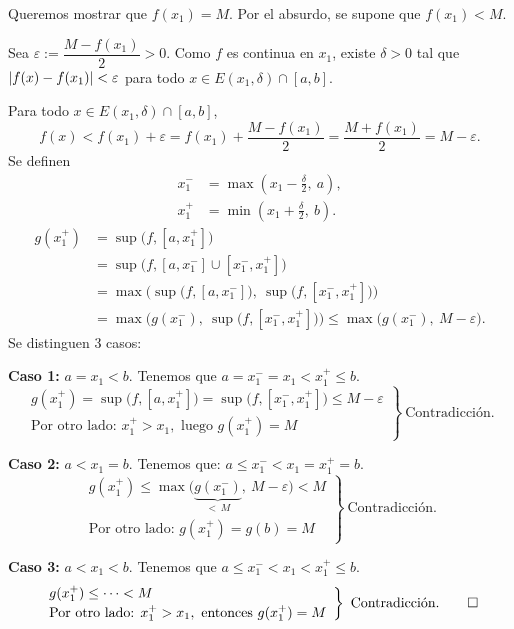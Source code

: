 \documentclass[11pt,a4paper]{article}
\begin{document}
\begin{demo}
Queremos mostrar que $f(x_1)=M$. Por el absurdo, se supone que $f(x_1)<M$.

Sea $\varepsilon:=\dfrac{M-f(x_1)}{2}>0$. Como $f$ es continua en $x_1$, existe $\delta>0$ tal que $\lvert f(x)-f(x_1)\rvert<\varepsilon$ para todo $x\in E(x_1,\delta)\cap[a,b]$.

Para todo $x\in E(x_1,\delta)\cap[a,b]$,
\[
  f(x)<f(x_1)+\varepsilon = f(x_1)+\frac{M-f(x_1)}{2} = \frac{M+f(x_1)}{2} = M-\varepsilon.
\]
Se definen
\begin{align*}
  x_1^- &= \max\left(x_1-\frac\delta2,\ a\right),\\
  x_1^+ &= \min\left(x_1+\frac\delta2,\ b\right).
\end{align*}
\begin{align*}
  g(x_1^+) &= \sup\big(f,[a,x_1^+]\big)\\
  &= \sup\big(f,[a,x_1^-]\cup[x_1^-,x_1^+]\big)\\
  &= \max\Big(\sup\big(f,[a,x_1^-]\big),\ \sup\big(f,[x_1^-,x_1^+]\big)\Big)\\
  &= \max\Big(g(x_1^-),\ \sup\big(f,[x_1^-,x_1^+]\big)\Big) \leq \max\big(g(x_1^-),\ M-\varepsilon\big).
\end{align*}
Se distinguen 3 casos:

\textbf{Caso 1:} $a=x_1<b$. Tenemos que $a=x_1^-=x_1<x_1^+\leq b$.
\[
  \left.\begin{array}{l}
    g(x_1^+)=\sup\big(f,[a,x_1^+]\big)=\sup\big(f,[x_1^-,x_1^+]\big)\leq M-\varepsilon\\[2pt]
    \text{Por otro lado: } x_1^+>x_1, \text{ luego } g(x_1^+)=M
  \end{array}\right\}\ \text{Contradicción.}
\]

\textbf{Caso 2:} $a<x_1=b$. Tenemos que: $a\leq x_1^-<x_1=x_1^+=b$.
\[
  \left.\begin{array}{l}
    g(x_1^+)\leq\max\big(\underbrace{g(x_1^-)}_{<\,M},\ M-\varepsilon\big)<M\\[2pt]
    \text{Por otro lado: } g(x_1^+)=g(b)=M
  \end{array}\right\}\ \text{Contradicción.}
\]

\textbf{Caso 3:} $a<x_1<b$. Tenemos que $a\leq x_1^-<x_1<x_1^+\leq b$.
\[
  \left.\begin{array}{l}
    g(x_1^+)\leq\dots<M\\[2pt]
    \text{Por otro lado: } x_1^+>x_1, \text{ entonces } g(x_1^+)=M
  \end{array}\right\}\ \text{Contradicción.} \qedhere
\]
\end{demo}
\end{document}
